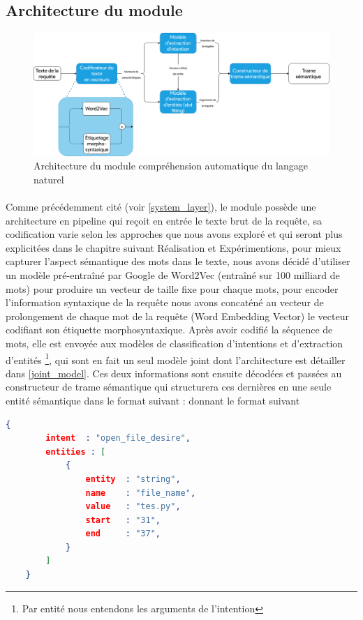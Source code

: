 	\subsection{Architecture du module}
	\begin{figure}[H] 
		\label{nlu_arch}
		\centering
		\includegraphics[width=0.88\linewidth]{images/Conception/NLU/nlu_module_arch.png}
		\caption{Architecture du module compréhension automatique du langage naturel}
	\end{figure}
	\paragraph{}
	\label{encoding}
	Comme précédemment cité (voir \ref{system_layer}), le module possède une architecture en pipeline qui reçoit en entrée le texte brut de la requête, sa codification varie selon les approches que nous avons exploré et qui seront plus explicitées dans le chapitre suivant Réalisation et Expérimentions, pour mieux capturer l'aspect sémantique des mots dans le texte, nous avons décidé d'utiliser un modèle pré-entraîné par Google de Word2Vec (entraîné sur 100 milliard de mots) pour produire un vecteur de taille fixe pour chaque mots, pour encoder l'information syntaxique de la requête nous avons concaténé au vecteur de prolongement de chaque mot de la requête (Word Embedding Vector) le vecteur codifiant son étiquette morphosyntaxique. Après avoir codifié la séquence de mots, elle est envoyée aux modèles de classification d'intentions et d'extraction d'entités \footnote{Par entité nous entendons les arguments de l'intention}, qui sont en fait un seul modèle joint dont l'architecture est détailler dans \ref{joint_model}. Ces deux informations sont ensuite décodées et passées au constructeur de trame sémantique qui structurera ces dernières en une seule entité sémantique dans le format suivant : 
	donnant le format suivant \begin{lstlisting}[language=json]
	{
		intent  : "open_file_desire",
		entities : [
			{	
				entity	: "string",
				name	: "file_name",
				value	: "tes.py",
				start	: "31",
				end		: "37",
			}
		]
	}
	\end{lstlisting}
	
